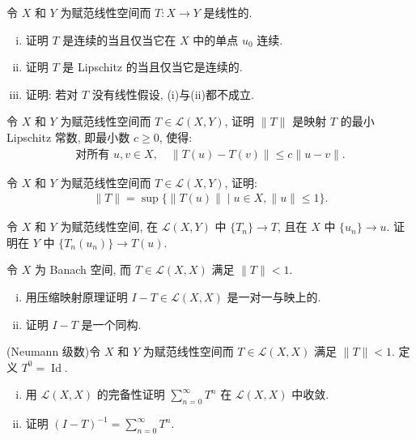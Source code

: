 \documentclass[../../main.tex]{subfiles}
\begin{document}
\begin{exercise}\label{exercise:ch13-09}
令 $X$ 和 $Y$ 为赋范线性空间而 $T:X\to Y$ 是线性的.
\begin{enumerate}[(i)]
\item 证明 $T$ 是连续的当且仅当它在 $X$ 中的单点 $u_{0}$ 连续.
\item 证明 $T$ 是 Lipschitz 的当且仅当它是连续的.
\item 证明: 若对 $T$ 没有线性假设, (i)与(ii)都不成立.
\end{enumerate}
\end{exercise}

\begin{exercise}\label{exercise:ch13-10}
令 $X$ 和 $Y$ 为赋范线性空间而 $T\in\mathcal{L}(X,Y)$, 证明 $\|T\|$ 是映射 $T$ 的最小 Lipschitz 常数, 即最小数 $c\geqslant 0$, 使得:
\begin{align*}
\text{对所有 }u,v\in X,\quad\|T(u)-T(v)\|\leqslant c\|u-v\|.
\end{align*}
\end{exercise}

\begin{exercise}\label{exercise:ch13-11}
令 $X$ 和 $Y$ 为赋范线性空间而 $T\in\mathcal{L}(X,Y)$, 证明:
\begin{align*}
\|T\|=\sup\{\|T(u)\|\mid u\in X,\|u\|\leqslant 1\}.
\end{align*}
\end{exercise}

\begin{exercise}\label{exercise:ch13-12}
令 $X$ 和 $Y$ 为赋范线性空间, 在 $\mathcal{L}(X,Y)$ 中 $\{T_{n}\}\to T$, 且在 $X$ 中 $\{u_{n}\}\to u$. 证明在 $Y$ 中 $\{T_{n}(u_{n})\}\to T(u)$.
\end{exercise}

\begin{exercise}\label{exercise:ch13-13}
令 $X$ 为 Banach 空间, 而 $T\in\mathcal{L}(X,X)$ 满足 $\|T\|<1$.
\begin{enumerate}[(i)]
\item 用压缩映射原理证明 $I-T\in\mathcal{L}(X,X)$ 是一对一与映上的.
\item 证明 $I-T$ 是一个同构.
\end{enumerate}
\end{exercise}

\begin{exercise}\label{exercise:ch13-14}
(Neumann 级数)令 $X$ 和 $Y$ 为赋范线性空间而 $T\in\mathcal{L}(X,X)$ 满足 $\|T\|<1$. 定义 $T^{0}=\operatorname{Id}$.
\begin{enumerate}[(i)]
\item 用 $\mathcal{L}(X,X)$ 的完备性证明 $\sum_{n=0}^{\infty}T^{n}$ 在 $\mathcal{L}(X,X)$ 中收敛.
\item 证明 $(I-T)^{-1}=\sum_{n=0}^{\infty}T^{n}$.
\end{enumerate}
\end{exercise}
\end{document}
